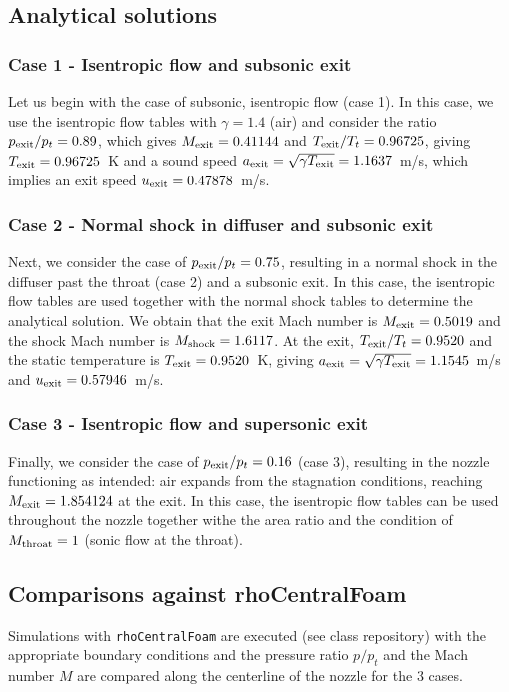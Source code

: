 \documentclass[12pt]{article}
\begin{document}
\subsection{Analytical solutions}

\subsubsection{Case 1 \-- Isentropic flow and subsonic exit}
Let us begin with the case of subsonic, isentropic flow (case 1).
In this case, we use the isentropic flow tables with $\gamma=1.4$ (air) and consider
the ratio $p_{\rm exit}/p_t = 0.89$, which gives $M_{\rm exit}=0.41144$
and $T_{\rm exit}/T_t = 0.96725$, giving $T_{\rm exit} = 0.96725$~K and a sound speed
$a_{\rm exit} = \sqrt{ \gamma T_{\rm exit} } = 1.1637$~m/s, which implies
an exit speed $u_{\rm exit} = 0.47878$~m/s.


\subsubsection{Case 2 \-- Normal shock in diffuser and subsonic exit}
Next, we consider the case of $p_{\rm exit}/p_t = 0.75$, resulting in a normal shock in the diffuser past the throat (case 2)
and a subsonic exit.
In this case, the isentropic flow tables are used together with the normal shock tables to
determine the analytical solution.
We obtain that the exit Mach number is $M_{\rm exit}=0.5019$ and the
shock Mach number is $M_{\rm shock}=1.6117$.
At the exit, $T_{\rm exit}/T_t =0.9520$ and the static temperature is $T_{\rm exit}=0.9520$~K, giving 
$a_{\rm exit} = \sqrt{ \gamma T_{\rm exit} } = 1.1545$~m/s and $u_{\rm exit} = 0.57946$~m/s.


\subsubsection{Case 3 \-- Isentropic flow and supersonic exit}
Finally, we consider the case of $p_{\rm exit}/p_t = 0.16$ (case 3), resulting in the nozzle functioning as intended:
air expands from the stagnation conditions, reaching $M_{\rm exit}=1.854124$ at the exit.
In this case, the isentropic flow tables can be used throughout the nozzle together withe the
area ratio and the condition of $M_{\rm throat}=1$ (sonic flow at the throat). 


\subsection{Comparisons against rhoCentralFoam}
Simulations with \Verb+rhoCentralFoam+ are executed (see class repository) with the appropriate boundary conditions
and the pressure ratio $p/p_t$ and the Mach number $M$ are compared along the centerline
of the nozzle for the 3 cases.
\end{document}
